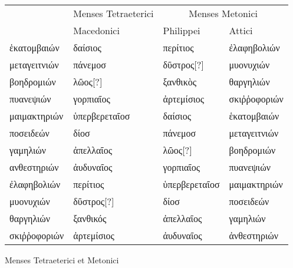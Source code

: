 \begin{tabular}{@{}l l  ll@{}}
\toprule
 &
 \multicolumn{1}{c}{Menses Tetraeterici} &
 \multicolumn{2}{c}{Menses Metonici} \\
\cmidrule(lr){2-2} \cmidrule(lr){3-4}
 ~ & Macedonici &  Philippei & Attici \\
\midrule
 \textgreek{ἑκατομβαιών} &
 \textgreek{δαίσιος} &
 \textgreek{περίτιος} &
 \textgreek{ἐλαφηβολιών}
\\
 \textgreek{μεταγειτνιών} &
 \textgreek{πάνεμοσ} &
 \textgreek{δῦστρος[?]} &
 \textgreek{μυονυχιών}
\\
 \textgreek{βοηδρομιών} &
 \textgreek{λῶος[?]} & %
 \textgreek{ξανθικὸς} &
 \textgreek{θαργηλιών}
\\
\midrule
 \textgreek{πυανεψιών} &
 \textgreek{γορπιαῖος} &
 \textgreek{ἀρτεμίσιος} &
 \textgreek{σκιῤῥοφοριών}
\\
 \textgreek{μαιμακτηριών} &
 \textgreek{ὑπερβερεταῖοσ} &
 \textgreek{δαίσιος} &
 \textgreek{ἑκατομβαιών}
\\
 \textgreek{ποσειδεών} &
 \textgreek{δίοσ} &
 \textgreek{πάνεμοσ} &
 \textgreek{μεταγειτνιών}
\\
\midrule
 \textgreek{γαμηλιών} &
 \textgreek{ἀπελλαῖος} &
 \textgreek{λῶος[?]} &
 \textgreek{βοηδρομιών}
\\
 \textgreek{ανθεστηριών} &
 \textgreek{ἀυδυναῖος} &
 \textgreek{γορπιαῖος} &
 \textgreek{πυανεψιών}
\\
 \textgreek{ἐλαφηβολιών} &
 \textgreek{περίτιος} &
 \textgreek{ὑπερβερεταῖοσ} &
 \textgreek{μαιμακτηριών}
\\
\midrule
 \textgreek{μυονυχιών} &
 \textgreek{δῦστρος[?]} & %
 \textgreek{δίοσ} &
 \textgreek{ποσειδεών}
\\
 \textgreek{θαργηλιών} &
 \textgreek{ξανθικός} &
 \textgreek{ἀπελλαῖος} &
 \textgreek{γαμηλιών}
\\
 \textgreek{σκιῤῥοφοριών} &
 \textgreek{ἀρτεμίσιος} &
 \textgreek{ἀυδυναῖος} &
 \textgreek{ἀνθεστηριών}
\\
\bottomrule
\end{tabular}
%
\caption{Menses Tetraeterici et Metonici}
\label{tab:p84a}
